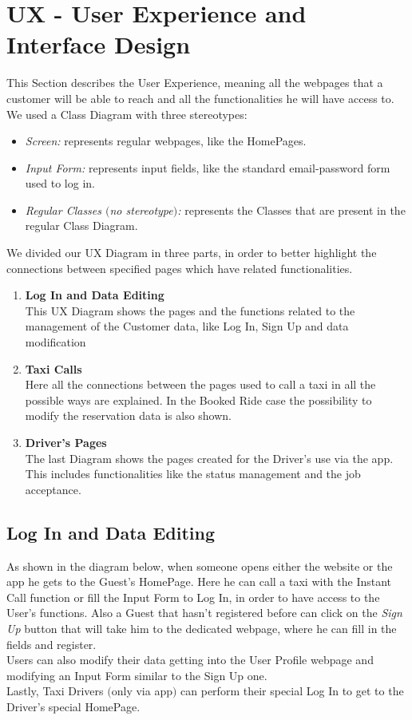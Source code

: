 \section{UX - User Experience and Interface Design}

This Section describes the User Experience, meaning all the webpages that a customer will be able to reach and all the functionalities he will have access to.
\newline
We used a Class Diagram with three stereotypes:
\begin {itemize}
\item \textit{Screen:} represents regular webpages, like the HomePages.
\item \textit{Input Form:} represents input fields, like the standard email-password form used to log in.
\item \textit{Regular Classes $($no stereotype$)$:} represents the Classes that are present in the regular Class Diagram.
\end {itemize} 
\hfill
\hfill

We divided our UX Diagram in three parts, in order to better highlight the connections between specified pages which have related functionalities.
\begin{enumerate}
\item \textbf{Log In and Data Editing}\\
	This UX Diagram shows the pages and the functions related to the management of the Customer data, like Log In, Sign Up and data modification
\item \textbf{Taxi Calls}\\
	Here all the connections between the pages used to call a taxi in all the possible ways are explained. 
	In the Booked Ride case the possibility to modify the reservation data is also shown.
\item \textbf{Driver's Pages}\\ 
	The last Diagram shows the pages created for the Driver's use via the app. 
	This includes functionalities like the status management and the job acceptance.
	
\end{enumerate}
\newpage

\subsection{Log In and Data Editing}
As shown in the diagram below, when someone opens either the website or the app he gets to the Guest's HomePage. Here he can call a taxi with the Instant Call function or fill the Input Form to Log In, in order to have access to the User's functions. Also a Guest that hasn't registered before can click on the \textit{Sign Up} button that will take him to the dedicated webpage, where he can fill in the fields and register.\\
Users can also modify their data getting into the User Profile webpage and modifying an Input Form similar to the Sign Up one. \\
Lastly, Taxi Drivers $($only via app$)$ can perform their special Log In to get to the Driver's special HomePage. 

